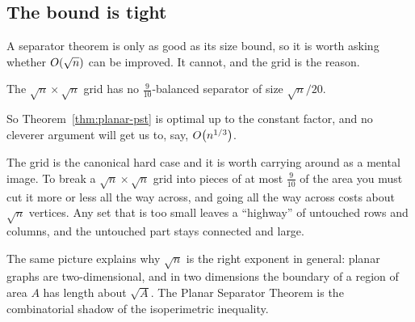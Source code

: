 \subsection{The bound is tight}

A separator theorem is only as good as its size bound, so it is worth asking
whether $O\!\left(\sqrt n\right)$ can be improved. It cannot, and the grid is the
reason.

\begin{proposition}\label{prop:planar-gridtight}
The $\sqrt{n} \times \sqrt{n}$ grid has no $\tfrac{9}{10}$-balanced separator
of size $\sqrt{n}/20$.
\end{proposition}

So Theorem~\ref{thm:planar-pst} is optimal up to the constant factor, and no cleverer
argument will get us to, say, $O\!\left(n^{1/3}\right)$.

\begin{intuition}
The grid is the canonical hard case and it is worth carrying around as a mental
image. To break a $\sqrt n \times \sqrt n$ grid into pieces of at most
$\tfrac{9}{10}$ of the area you must cut it more or less all the way across,
and going all the way across costs about $\sqrt n$ vertices. Any set that is
too small leaves a ``highway'' of untouched rows and columns, and the untouched
part stays connected and large.

The same picture explains why $\sqrt{n}$ is the right exponent in general:
planar graphs are two-dimensional, and in two dimensions the boundary of a
region of area $A$ has length about $\sqrt{A}$. The Planar Separator Theorem
is the combinatorial shadow of the isoperimetric inequality.
\end{intuition}

